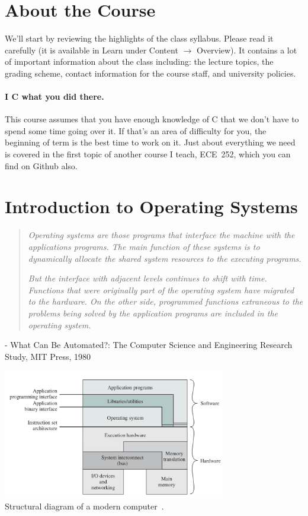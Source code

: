 




\section*{About the Course}
We'll start by reviewing the highlights of the class syllabus. Please read it carefully (it is available in Learn under Content $\rightarrow$ Overview). It contains a lot of important information about the class including: the lecture topics, the grading scheme, contact information for the course staff, and university policies.

\paragraph{I C what you did there.}
This course assumes that you have enough knowledge of C that we don't have to spend some time going over it. If that's an area of difficulty for you, the beginning of term is the best time to work on it. Just about everything we need is covered in the first topic of another course I teach, ECE~252, which you can find on Github also.

\section*{Introduction to Operating Systems}


\begin{quote}
\textit{Operating systems are those programs that interface the machine with the applications programs. The main function of these systems is to dynamically allocate the shared system resources to the executing programs.}

\textit{But the interface with adjacent levels continues to shift with
time. Functions that were originally part of the operating system have migrated to the hardware. On the other side, programmed functions extraneous to the problems being solved by the application programs are included in the operating system.
}
\end{quote}

\hfill - What Can Be Automated?: The Computer Science and Engineering Research Study, MIT Press, 1980

\begin{center}
\includegraphics[width=0.73\textwidth]{images/os-sw-hw.png}\\
Structural diagram of a modern computer~\cite{osi}.
\end{center}

